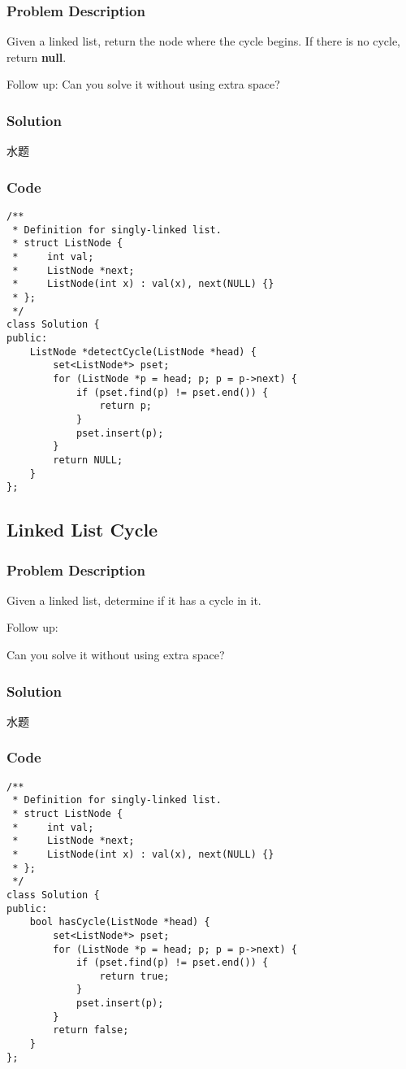 \documentclass[courier]{article}
\begin{document}
\begin{CJK*}{UTF8}{gkai}
\subsubsection*{Problem Description}
Given a linked list, return the node where the cycle begins. If there is no cycle, return \textbf{null}.

Follow up:
Can you solve it without using extra space?



\subsubsection*{Solution}
水题

\subsubsection*{Code}
\begin{lstlisting}
/**
 * Definition for singly-linked list.
 * struct ListNode {
 *     int val;
 *     ListNode *next;
 *     ListNode(int x) : val(x), next(NULL) {}
 * };
 */
class Solution {
public:
    ListNode *detectCycle(ListNode *head) {
        set<ListNode*> pset;
        for (ListNode *p = head; p; p = p->next) {
            if (pset.find(p) != pset.end()) {
                return p;
            }
            pset.insert(p);
        }
        return NULL;
    }
}; 
\end{lstlisting}


\subsection{ Linked List Cycle }

\subsubsection*{Problem Description}
Given a linked list, determine if it has a cycle in it.

Follow up:


Can you solve it without using extra space?



\subsubsection*{Solution}
水题

\subsubsection*{Code}
\begin{lstlisting}
/**
 * Definition for singly-linked list.
 * struct ListNode {
 *     int val;
 *     ListNode *next;
 *     ListNode(int x) : val(x), next(NULL) {}
 * };
 */
class Solution {
public:
    bool hasCycle(ListNode *head) {
        set<ListNode*> pset;
        for (ListNode *p = head; p; p = p->next) {
            if (pset.find(p) != pset.end()) {
                return true;
            }
            pset.insert(p);
        }
        return false;
    }
}; 
\end{lstlisting}



\end{CJK*}
\end{document}
